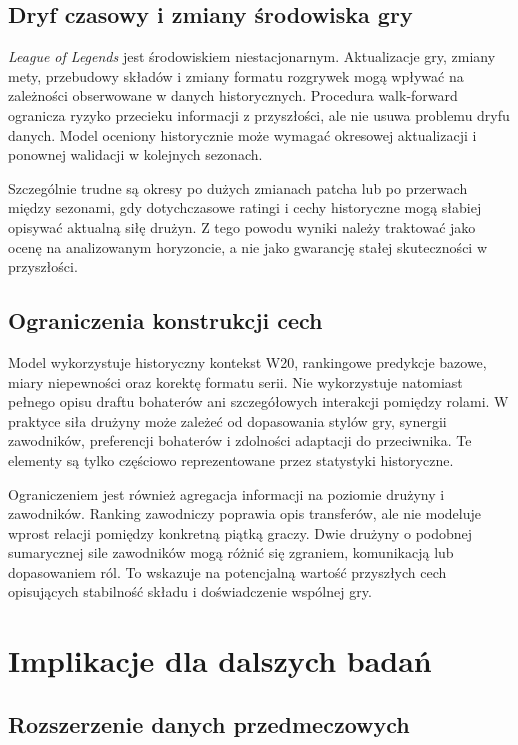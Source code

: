 \subsection{Dryf czasowy i zmiany środowiska gry}

\textit{League of Legends} jest środowiskiem niestacjonarnym. Aktualizacje gry, zmiany mety,
przebudowy składów i zmiany formatu rozgrywek mogą wpływać na zależności obserwowane w danych
historycznych. Procedura walk-forward ogranicza ryzyko przecieku informacji z przyszłości, ale nie
usuwa problemu dryfu danych. Model oceniony historycznie może wymagać okresowej aktualizacji i
ponownej walidacji w kolejnych sezonach.

Szczególnie trudne są okresy po dużych zmianach patcha lub po przerwach między sezonami, gdy
dotychczasowe ratingi i cechy historyczne mogą słabiej opisywać aktualną siłę drużyn. Z tego powodu
wyniki należy traktować jako ocenę na analizowanym horyzoncie, a nie jako gwarancję stałej
skuteczności w przyszłości.

\subsection{Ograniczenia konstrukcji cech}

Model wykorzystuje historyczny kontekst W20, rankingowe predykcje bazowe, miary niepewności oraz
korektę formatu serii. Nie wykorzystuje natomiast pełnego opisu draftu bohaterów ani szczegółowych
interakcji pomiędzy rolami. W praktyce siła drużyny może zależeć od dopasowania stylów gry, synergii
zawodników, preferencji bohaterów i zdolności adaptacji do przeciwnika. Te elementy są tylko
częściowo reprezentowane przez statystyki historyczne.

Ograniczeniem jest również agregacja informacji na poziomie drużyny i zawodników. Ranking zawodniczy
poprawia opis transferów, ale nie modeluje wprost relacji pomiędzy konkretną piątką graczy. Dwie
drużyny o podobnej sumarycznej sile zawodników mogą różnić się zgraniem, komunikacją lub
dopasowaniem ról. To wskazuje na potencjalną wartość przyszłych cech opisujących stabilność składu i
doświadczenie wspólnej gry.

\section{Implikacje dla dalszych badań}

\subsection{Rozszerzenie danych przedmeczowych}


